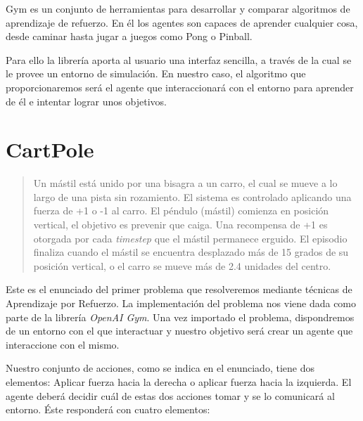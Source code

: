 Gym es un conjunto de herramientas para desarrollar y comparar algoritmos de aprendizaje de refuerzo. En él los agentes son capaces de aprender cualquier cosa, desde caminar hasta jugar a juegos como Pong o Pinball.

Para ello la librería aporta al usuario una interfaz sencilla, a través de la cual se le provee un entorno de simulación. En nuestro caso, el algoritmo que proporcionaremos será el agente que interaccionará con el entorno para aprender de él e intentar lograr unos objetivos.

\section{CartPole}
\begin{quote}
    Un mástil está unido por una bisagra a un carro, el cual se mueve a lo largo de una pista sin rozamiento. El sistema es controlado aplicando una fuerza de +1 o -1 al carro. El péndulo (mástil) comienza en posición vertical, el objetivo es prevenir que caiga. Una recompensa de +1 es otorgada por cada \textit{timestep} que el mástil permanece erguido. El episodio finaliza cuando el mástil se encuentra desplazado más de 15 grados de su posición vertical, o el carro se mueve más de 2.4 unidades del centro.
\end{quote}

Este es el enunciado del primer problema que resolveremos mediante técnicas de Aprendizaje por Refuerzo. La implementación del problema nos viene dada como parte de la librería \textit{OpenAI Gym}. Una vez importado el problema, dispondremos de un entorno con el que interactuar y nuestro objetivo será crear un agente que interaccione con el mismo.

Nuestro conjunto de acciones, como se indica en el enunciado, tiene dos elementos: Aplicar fuerza hacia la derecha o aplicar fuerza hacia la izquierda. El agente deberá decidir cuál de estas dos acciones tomar y se lo comunicará al entorno. Éste responderá con cuatro elementos:

